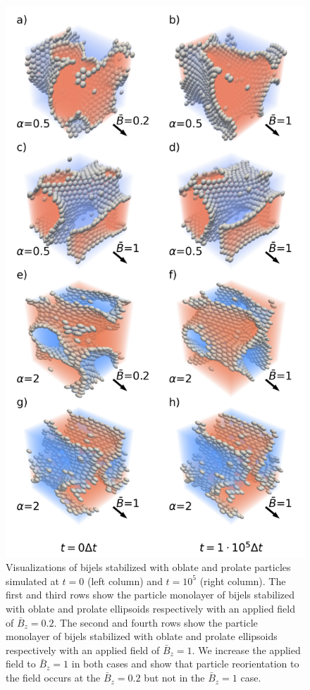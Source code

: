 \begin{figure}
\centering 
\includegraphics[scale=0.4]{../figures/results/paper2/microstructure_viz-field_up.png} 
\caption{Visualizations of bijels stabilized with oblate and prolate particles simulated at $t = 0$ (left column) and $t = 10^5$ (right column). 
         The first and third rows show the particle monolayer of bijels stabilized with oblate and prolate ellipsoids respectively with an applied 
         field of $\bar{B}_z = 0.2$. The second and fourth rows show the particle monolayer of bijels stabilized with oblate and prolate ellipsoids 
         respectively with an applied field of $\bar{B}_z = 1$. We increase the applied field to $\bar{B}_z = 1$ in both cases and show that particle 
         reorientation to the field occurs at the $\bar{B}_z = 0.2$ but not in the $\bar{B}_z = 1$ case.}
\label{fig:microstructure_viz-field_up}
\end{figure}

